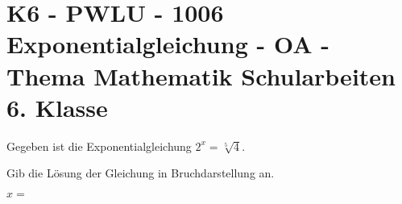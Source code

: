 \section{K6 - PWLU - 1006 Exponentialgleichung - OA - Thema Mathematik Schularbeiten 6. Klasse}

\begin{beispiel}[K6 - PWLU]{1} %
			Gegeben ist die Exponentialgleichung $2^x=\sqrt[5]{4}$.
			
			Gib die Lösung der Gleichung in Bruchdarstellung an.\leer
			
			$x=$ 
							\end{beispiel}